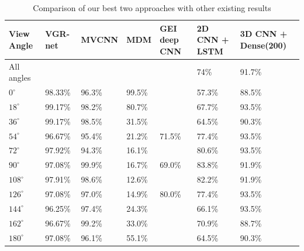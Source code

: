 \documentclass[12pt]{article}
\theoremstyle{definition}
\begin{document}
	\begin{table}[h]
		\centering
		\renewcommand{\arraystretch}{1.35}

		\caption{Comparison of our best two approaches with other existing results}
		\label{table:camparison-results}

		\begin{tabularx}{\textwidth}{X|X|X|X|X|X|X}
			\textbf{View Angle} & \textbf{VGR-net \cite{VGR-Net}} & \textbf{MVCNN \cite{Wolf2016MultiviewGR}} & \textbf{MDM \cite{gait-with-curvature-map}} & \textbf{GEI deep CNN \cite{gait-with-gei}} & \textbf{2D CNN + LSTM} & \textbf{3D CNN + Dense(200)}\\ \hline
			All angles  & \textbf{\textendash} & \textbf{\textendash} & \textbf{\textendash} & \textbf{\textendash} & 74\%   & 91.7\% \\ \hline
			$0^\circ$   & 98.33\%              & 96.3\%               & 99.5\%               & \textbf{\textendash} & 57.3\% & 88.5\% \\ \hline
			$18^\circ$  & 99.17\%              & 98.2\%               & 80.7\%               & \textbf{\textendash} & 67.7\% & 93.5\% \\ \hline
			$36^\circ$  & 99.17\%              & 98.5\%               & 31.5\%               & \textbf{\textendash} & 64.5\% & 90.3\% \\ \hline
			$54^\circ$  & 96.67\%              & 95.4\%               & 21.2\%               & 71.5\%               & 77.4\% & 93.5\% \\ \hline
			$72^\circ$  & 97.92\%              & 94.3\%               & 16.1\%               & \textbf{\textendash} & 80.6\% & 93.5\% \\ \hline
			$90^\circ$  & 97.08\%              & 99.9\%               & 16.7\%               & 69.0\%               & 83.8\% & 91.9\% \\ \hline
			$108^\circ$ & 97.91\%              & 98.6\%               & 12.6\%               & \textbf{\textendash} & 82.2\% & 91.9\% \\ \hline
			$126^\circ$ & 97.08\%              & 97.0\%               & 14.9\%               & 80.0\%               & 77.4\% & 93.5\% \\ \hline
			$144^\circ$ & 96.25\%              & 97.4\%               & 24.3\%               & \textbf{\textendash} & 66.1\% & 93.5\% \\ \hline
			$162^\circ$ & 96.67\%              & 99.2\%               & 33.0\%               & \textbf{\textendash} & 70.9\% & 88.7\% \\ \hline
			$180^\circ$ & 97.08\%              & 96.1\%               & 55.1\%               & \textbf{\textendash} & 64.5\% & 90.3\% \\
		\end{tabularx}
	\end{table}
\end{document}
